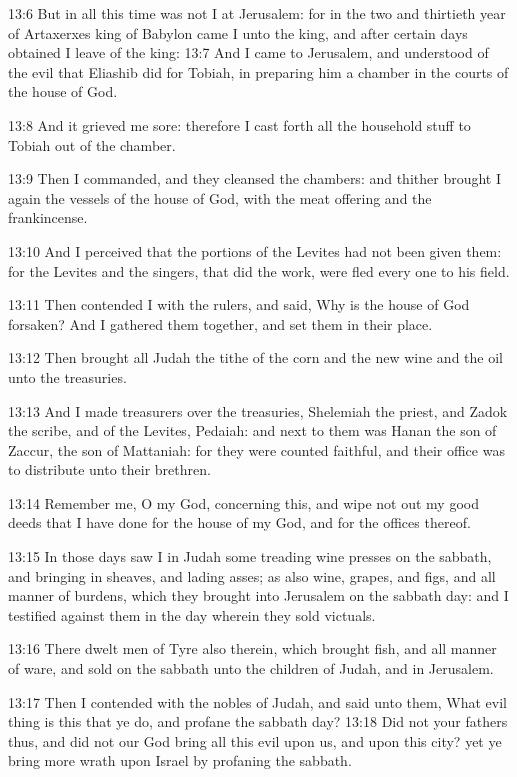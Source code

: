 13:6 But in all this time was not I at Jerusalem: for in the two and
thirtieth year of Artaxerxes king of Babylon came I unto the king, and
after certain days obtained I leave of the king: 13:7 And I came to
Jerusalem, and understood of the evil that Eliashib did for Tobiah, in
preparing him a chamber in the courts of the house of God.

13:8 And it grieved me sore: therefore I cast forth all the household
stuff to Tobiah out of the chamber.

13:9 Then I commanded, and they cleansed the chambers: and thither
brought I again the vessels of the house of God, with the meat
offering and the frankincense.

13:10 And I perceived that the portions of the Levites had not been
given them: for the Levites and the singers, that did the work, were
fled every one to his field.

13:11 Then contended I with the rulers, and said, Why is the house of
God forsaken? And I gathered them together, and set them in their
place.

13:12 Then brought all Judah the tithe of the corn and the new wine
and the oil unto the treasuries.

13:13 And I made treasurers over the treasuries, Shelemiah the priest,
and Zadok the scribe, and of the Levites, Pedaiah: and next to them
was Hanan the son of Zaccur, the son of Mattaniah: for they were
counted faithful, and their office was to distribute unto their
brethren.

13:14 Remember me, O my God, concerning this, and wipe not out my good
deeds that I have done for the house of my God, and for the offices
thereof.

13:15 In those days saw I in Judah some treading wine presses on the
sabbath, and bringing in sheaves, and lading asses; as also wine,
grapes, and figs, and all manner of burdens, which they brought into
Jerusalem on the sabbath day: and I testified against them in the day
wherein they sold victuals.

13:16 There dwelt men of Tyre also therein, which brought fish, and
all manner of ware, and sold on the sabbath unto the children of
Judah, and in Jerusalem.

13:17 Then I contended with the nobles of Judah, and said unto them,
What evil thing is this that ye do, and profane the sabbath day?
13:18 Did not your fathers thus, and did not our God bring all this
evil upon us, and upon this city? yet ye bring more wrath upon Israel
by profaning the sabbath.

